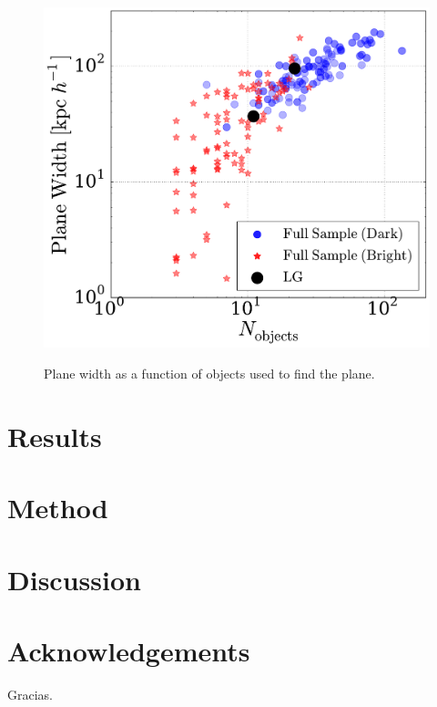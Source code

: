 \documentclass{emulateapj}
\begin{document}
\begin{figure}
\centering
\includegraphics[width=\hsize]{plane_width_n_dark.pdf}\\
\caption{Plane width as a function of objects used to find the plane.}
\label{fig:plane_width_nobjects}
\end{figure}

\section{Results}
\label{Results}

\section{Method}
\label{Method}




\section{Discussion} 
\section{Acknowledgements}
Gracias.


\end{document}
